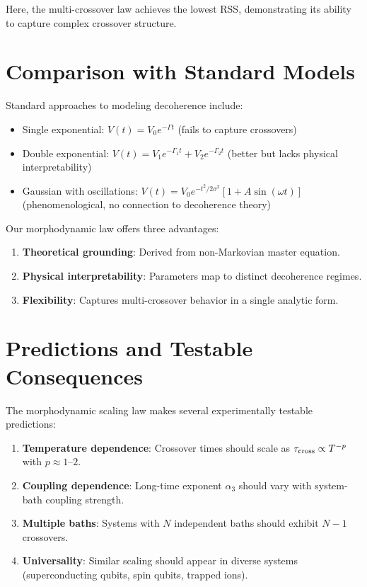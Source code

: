 \documentclass[12pt,a4paper]{article}
\begin{document}
Here, the multi-crossover law achieves the lowest RSS, demonstrating its ability to capture complex crossover structure.

\section{Comparison with Standard Models}

Standard approaches to modeling decoherence include:
\begin{itemize}
\item Single exponential: $V(t) = V_0 e^{-\Gamma t}$ (fails to capture crossovers)
\item Double exponential: $V(t) = V_1 e^{-\Gamma_1 t} + V_2 e^{-\Gamma_2 t}$ (better but lacks physical interpretability)
\item Gaussian with oscillations: $V(t) = V_0 e^{-t^2/2\sigma^2} [1 + A \sin(\omega t)]$ (phenomenological, no connection to decoherence theory)
\end{itemize}

Our morphodynamic law offers three advantages:
\begin{enumerate}
\item \textbf{Theoretical grounding}: Derived from non-Markovian master equation.
\item \textbf{Physical interpretability}: Parameters map to distinct decoherence regimes.
\item \textbf{Flexibility}: Captures multi-crossover behavior in a single analytic form.
\end{enumerate}

\section{Predictions and Testable Consequences}

The morphodynamic scaling law makes several experimentally testable predictions:
\begin{enumerate}
\item \textbf{Temperature dependence}: Crossover times should scale as $\tau_{\rm cross} \propto T^{-p}$ with $p \approx 1\text{--}2$.
\item \textbf{Coupling dependence}: Long-time exponent $\alpha_3$ should vary with system-bath coupling strength.
\item \textbf{Multiple baths}: Systems with $N$ independent baths should exhibit $N-1$ crossovers.
\item \textbf{Universality}: Similar scaling should appear in diverse systems (superconducting qubits, spin qubits, trapped ions).
\end{enumerate}
\end{document}
